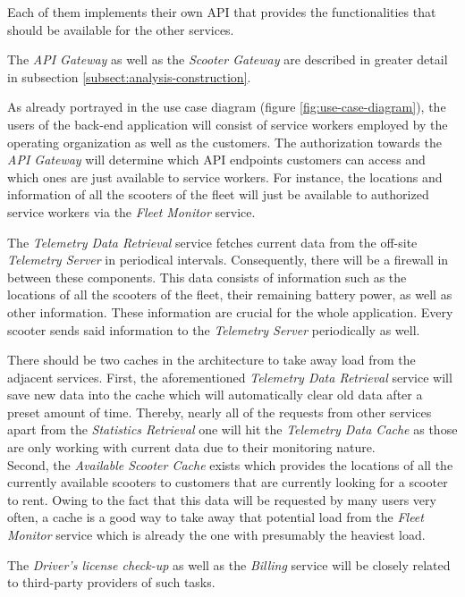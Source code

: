 \documentclass[12pt,a4paper]{report}
\begin{document}
Each of them implements their own API that provides the functionalities that
should be available for the other services.

The \textit{API Gateway} as well as the \textit{Scooter Gateway} are described
in greater detail in subsection \ref{subsect:analysis-construction}.

As already portrayed in the use case diagram (figure \ref{fig:use-case-diagram}),
the users of the back-end application will consist of service workers employed
by the operating organization as well as the customers.
The authorization towards the \textit{API Gateway} will determine which
API endpoints customers can access and which ones are just available to
service workers. For instance, the locations and information of all the scooters
of the fleet will just be available to authorized service workers via the
\textit{Fleet Monitor} service.

The \textit{Telemetry Data Retrieval} service fetches current data from the
off-site \textit{Telemetry Server} in periodical intervals.
Consequently, there will be a firewall in between these components.
This data consists of information such as the locations of all the scooters
of the fleet, their remaining battery power, as well as other information.
These information are crucial for the whole application.
Every scooter sends said information to the \textit{Telemetry Server}
periodically as well.

There should be two caches in the architecture to take away load from the
adjacent services. First, the aforementioned \textit{Telemetry Data Retrieval}
service will save new data into the cache which will automatically clear old
data after a preset amount of time. Thereby, nearly all of the requests from
other services apart from the \textit{Statistics Retrieval} one will hit the
\textit{Telemetry Data Cache} as those are only working with current data due
to their monitoring nature.\\
Second, the \textit{Available Scooter Cache} exists which provides the locations
of all the currently available scooters to customers that are currently looking
for a scooter to rent. Owing to the fact that this data will be requested by
many users very often, a cache is a good way to take away that potential load
from the \textit{Fleet Monitor} service which is already the one with
presumably the heaviest load.

The \textit{Driver's license check-up} as well as the \textit{Billing} service
will be closely related to third-party providers of such tasks.\\
\end{document}
